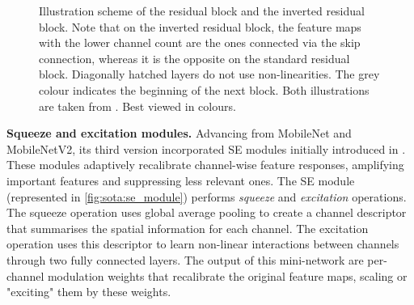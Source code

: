 \begin{figure}[htbp]
  \centering
  \caption{Illustration scheme of the residual block and the inverted residual
    block. Note that on the inverted residual block, the feature maps with the lower
    channel count are the ones connected via the skip connection, whereas it is the
    opposite on the standard residual block. Diagonally hatched layers do not use
    non-linearities. The grey colour indicates the beginning of the next block. Both
    illustrations are taken from \cite{DongMobileNetV2}. Best viewed in colours.}
  \label{fig:sota:inverted_vs_residual_blocks}
\end{figure}


\noindent\textbf{Squeeze and excitation modules.} Advancing from MobileNet and
MobileNetV2, its third version \cite{DBLP:conf/iccv/HowardPALSCWCTC19}
incorporated \ac{SE} modules initially introduced in
\cite{DBLP:conf/cvpr/HuSS18}. These modules adaptively recalibrate channel-wise
feature responses, amplifying important features and suppressing less relevant
ones. The \ac{SE} module (represented in \cref{fig:sota:se_module}) performs
\emph{squeeze} and \emph{excitation} operations. The squeeze operation uses
global average pooling to create a channel descriptor that summarises the
spatial information for each channel. The excitation operation uses this
descriptor to learn non-linear interactions between channels through two fully
connected layers. The output of this mini-network are per-channel modulation
weights that recalibrate the original feature maps, scaling or "exciting" them
by these weights.\\

